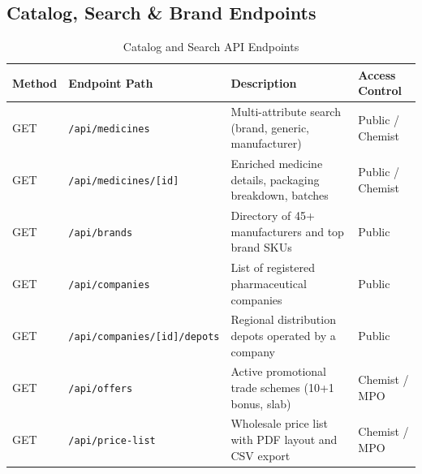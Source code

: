 \documentclass[10pt,a4paper]{article}
\begin{document}
\subsection{Catalog, Search \& Brand Endpoints}
\begin{table}[h!]
\centering
\small
\begin{tabularx}{\textwidth}{lp{4.0cm}Xp{2.5cm}}
\toprule
\textbf{Method} & \textbf{Endpoint Path} & \textbf{Description} & \textbf{Access Control} \\
\midrule
GET & \texttt{/api/medicines} & Multi-attribute search (brand, generic, manufacturer) & Public / Chemist \\
GET & \texttt{/api/medicines/[id]} & Enriched medicine details, packaging breakdown, batches & Public / Chemist \\
GET & \texttt{/api/brands} & Directory of 45+ manufacturers and top brand SKUs & Public \\
GET & \texttt{/api/companies} & List of registered pharmaceutical companies & Public \\
GET & \texttt{/api/companies/[id]/depots} & Regional distribution depots operated by a company & Public \\
GET & \texttt{/api/offers} & Active promotional trade schemes (10+1 bonus, slab) & Chemist / MPO \\
GET & \texttt{/api/price-list} & Wholesale price list with PDF layout and CSV export & Chemist / MPO \\
\bottomrule
\end{tabularx}
\caption{Catalog and Search API Endpoints}
\end{table}
\end{document}
